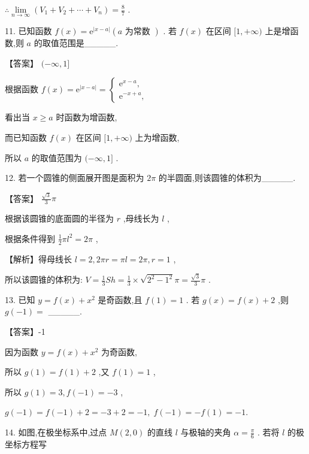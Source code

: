 \documentclass[10pt]{article}
\begin{document}
\(\therefore \mathop{\lim }\limits_{{n \rightarrow  \infty }}\left( {{V}_{1} + {V}_{2} + \cdots  + {V}_{n}}\right)  = \frac{8}{7}\) .

11. 已知函数 \(f\left( x\right)  = {\mathrm{e}}^{\left| x - a\right| }\left( {a\text{ 为常数 }}\right)\) . 若 \(f\left( x\right)\) 在区间 \(\lbrack 1, + \infty )\) 上是增函数,则 \(a\) 的取值范围是\_\_\_\_\_.

【答案】 \(( - \infty ,1\rbrack\)

根据函数 \(f\left( x\right)  = {\mathrm{e}}^{\left| x - a\right| } = \left\{  \begin{array}{l} {\mathrm{e}}^{x - a}, \\  {\mathrm{e}}^{-x + a}, \end{array}\right.\)

看出当 \(x \geq  a\) 时函数为增函数,

而已知函数 \(f\left( x\right)\) 在区间 \(\lbrack 1, + \infty )\) 上为增函数,

所以 \(a\) 的取值范围为 \(( - \infty ,1\rbrack\) .

12. 若一个圆锥的侧面展开图是面积为 \({2\pi }\) 的半圆面,则该圆锥的体积为\_\_\_\_\_.

【答案】 \(\frac{\sqrt{3}}{3}\pi\)

根据该圆锥的底面圆的半径为 \(r\) ,母线长为 \(l\) ,

根据条件得到 \(\frac{1}{2}\pi {l}^{2} = {2\pi }\) ,

【解析】得母线长 \(l = 2,{2\pi r} = {\pi l} = {2\pi },r = 1\) ,

所以该圆锥的体积为: \(V = \frac{1}{3}{Sh} = \frac{1}{3} \times  \sqrt{{2}^{2} - {1}^{2}}\pi  = \frac{\sqrt{3}}{3}\pi\) .

13. 已知 \(y = f\left( x\right)  + {x}^{2}\) 是奇函数,且 \(f\left( 1\right)  = 1\) . 若 \(g\left( x\right)  = f\left( x\right)  + 2\) ,则 \(g\left( {-1}\right)  =\) \_\_\_\_\_.

【答案】-1

因为函数 \(y = f\left( x\right)  + {x}^{2}\) 为奇函数,

所以 \(g\left( 1\right)  = f\left( 1\right)  + 2\) ,又 \(f\left( 1\right)  = 1\) ,

所以 \(g\left( 1\right)  = 3,f\left( {-1}\right)  =  - 3\) ,

\(g\left( {-1}\right)  = f\left( {-1}\right)  + 2 =  - 3 + 2 =  - 1,\;f\left( {-1}\right)  =  - f\left( 1\right)  =  - 1.\)

14. 如图,在极坐标系中,过点 \(M\left( {2,0}\right)\) 的直线 \(l\) 与极轴的夹角 \(\alpha  = \frac{\pi }{6}\) . 若将 \(l\) 的极坐标方程写
\end{document}
